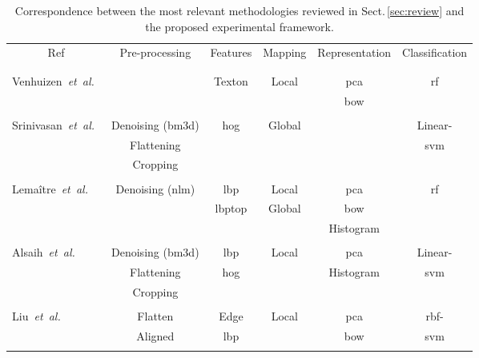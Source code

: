 \begin{table*}
  \caption{Correspondence between the most relevant methodologies reviewed in Sect.\,\ref{sec:review} and the proposed experimental framework.}
\centering
\footnotesize{
\begin{tabular}{l c	c c c c }
\toprule
\multicolumn{1}{c}{Ref} & Pre-processing & Features &  Mapping &  Representation & Classification\\
    &  &  &  &  & \\
\midrule
	&  &  &  &  & \\
\multirow{2}{*}{Venhuizen~\textit{et~al.}~\cite{Venhuizen2015,venhuizen2015feb-repoICPR}} &  & \multirow{2}{*}{Texton} & \multirow{2}{*}{Local}   &\gls{pca} & \multirow{2}{*}{\gls{rf}} \\
	&  &  &  & \gls{bow} & \\
	&  &  &  &  & \\
\multirow{3}{*}{Srinivasan~\textit{et~al.}~\cite{Srinivasan2014, srinivasan2014oct-repoICPR}} & Denoising (\gls{bm3d}) & \multirow{3}{*}{\gls{hog}} & \multirow{3}{*}{Global} & &  Linear- \\
 & Flattening & & & &\gls{svm} \\
 & Cropping & & & & \\
	&  &  &  &  & \\
\multirow{3}{*}{Lema\^itre~\textit{et~al.}~\cite{Lemaintre2015miccaiOCT, lemaitre2015apr-repoICPR}} & \multirow{3}{*}{ Denoising (\gls{nlm}) } & \gls{lbp} & Local &  \gls{pca} &  \multirow{3}{*}{\gls{rf}} \\
& & \gls{lbptop} & Global & \gls{bow}& \\
	&  &  &  &Histogram & \\
&  &  &  &  & \\

\multirow{3}{*}{Alsaih~\textit{et~al.}~\cite{alsaih2016classification, Alsaih2016apr-repoICPR}} & Denoising (\gls{bm3d}) & \gls{lbp} & \multirow{3}{*}{Local} &  \gls{pca} &  Linear- \\
& Flattening & \gls{hog} &  & Histogram  & \gls{svm}\\
& Cropping & & & & \\
&  &  &  &  & \\

\multirow{2}{*}{Liu~\textit{et~al.}~\cite{Liu2011,liu20016apr-repoICPR}} & Flatten & Edge & \multirow{2}{*}{Local} & \gls{pca}& \gls{rbf}- \\
 & Aligned & \gls{lbp} & &\gls{bow} & \gls{svm} \\
 	&  &  &  &  & \\


\end{tabular}}
\end{table*}
